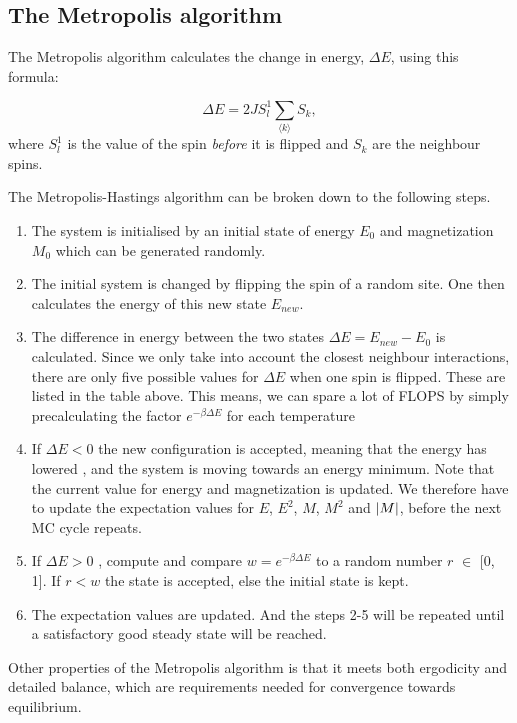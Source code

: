 \documentclass{article}
\begin{document}
\subsection{The Metropolis algorithm}\label{const_mot}

The Metropolis algorithm calculates the change in energy, $\Delta E$, using this formula:

\begin{equation}
\Delta E = 2JS^1_l\sum_{\langle k \rangle}S_k,
\end{equation}
where $S^1_l$ is the value of the spin \textit{before} it is flipped and $S_k$ are the neighbour spins. 






The Metropolis-Hastings algorithm can be broken down to the following steps.
\begin{enumerate}
\item The system is initialised by an initial state of energy $E_0$ and magnetization $M_0$ which can be  generated randomly. 
\item The initial system is changed by flipping the spin of a random site. One then calculates the energy of this new state $E_{new}$.
\item The difference in energy between the two states $\Delta E =  E_{new} -E_0$ is calculated. Since we only take into account the closest neighbour interactions, there are only five  possible values for $\Delta E$ when one spin is flipped. These are listed in the table above. This means, we can spare a lot of FLOPS by simply precalculating the factor  $e^{-\beta\Delta E}$  for each temperature  
\item If $ \Delta E < 0$ the new configuration is accepted, meaning that the energy has  lowered , and the system is moving towards an energy minimum. Note that the current value  for energy and magnetization is updated. We therefore have to update the expectation values for $E$, $E^2$, $M$, $M^2$ and $\abs{M}$, before the next MC cycle repeats.
\item If $ \Delta E > 0$ , compute and compare  $w =   e^{-\beta\Delta E}$  to a random number $r$ $\in$ [0, 1]. If $r < w$ the state is accepted, else the initial state is kept.
\item The expectation values are updated. And the steps 2-5 will be repeated until a satisfactory good steady state will be reached.

\end{enumerate}
Other properties of the Metropolis algorithm is that it meets both ergodicity and detailed balance, which are requirements needed for convergence towards equilibrium.
\end{document}
